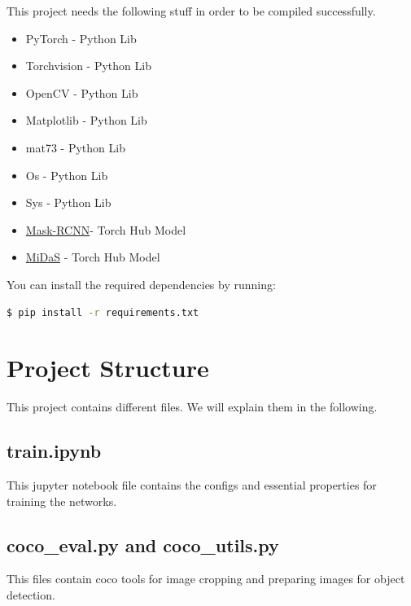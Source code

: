 \documentclass[a4paper, openany]{book}
\begin{document}
This project needs the following stuff in order to be compiled successfully.

\begin{itemize}
\item PyTorch - Python Lib
\item Torchvision - Python Lib
\item OpenCV - Python Lib
\item Matplotlib - Python Lib
\item mat73 - Python Lib
\item Os - Python Lib
\item Sys - Python Lib
\item \href{https://pytorch.org/vision/stable/_modules/torchvision/models/detection/mask_rcnn.html}{Mask-RCNN}- Torch Hub Model
\item \href{https://pytorch.org/hub/intelisl_midas_v2/}{MiDaS} - Torch Hub Model


\end{itemize}

You can install the required dependencies by running:

\begin{lstlisting}[language=bash]
  $ pip install -r requirements.txt
  \end{lstlisting}


\newpage

\section{Project Structure}
	\vspace{0.3cm}
	
This project contains different files. We will explain them in the following.
\subsection{train.ipynb}
	\vspace{0.3cm}
	
This jupyter notebook file contains the configs and essential properties for training the networks.

\subsection{coco\_eval.py and coco\_utils.py}
	\vspace{0.3cm}
This files contain coco tools for image cropping and preparing images for object detection.
\end{document}
